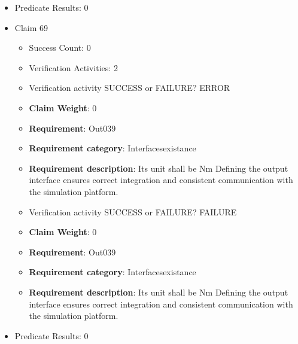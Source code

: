\documentclass{article}
\begin{document}
\begin{itemize}
\begin{itemize}
					\item Verification activity SUCCESS or FAILURE? FAILURE
					\item \textbf{Claim Weight}: 0
						\item \textbf{Requirement}: Out038 
						\item \textbf{Requirement category}: Interfacesexistance 
						\item \textbf{Requirement description}: Its unit shall be Nm Defining the output interface ensures correct integration and consistent communication with the simulation platform.
					
				\end{itemize}
				
									    
				\item Predicate Results: 0

  				  \item Claim 69
				\begin{itemize}
			    	\item Success Count: 0 
			    	\item Verification Activities: 2
					\item Verification activity SUCCESS or FAILURE? ERROR
					\item \textbf{Claim Weight}: 0
						\item \textbf{Requirement}: Out039 
						\item \textbf{Requirement category}: Interfacesexistance 
						\item \textbf{Requirement description}: Its unit shall be Nm Defining the output interface ensures correct integration and consistent communication with the simulation platform.
					
					\item Verification activity SUCCESS or FAILURE? FAILURE
					\item \textbf{Claim Weight}: 0
						\item \textbf{Requirement}: Out039 
						\item \textbf{Requirement category}: Interfacesexistance 
						\item \textbf{Requirement description}: Its unit shall be Nm Defining the output interface ensures correct integration and consistent communication with the simulation platform.
					
				\end{itemize}
				
									    
				\item Predicate Results: 0


\end{itemize}
\end{document}
